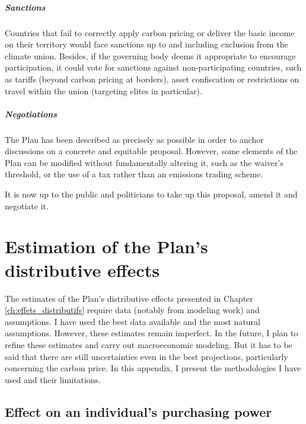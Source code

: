 \documentclass[a5paper,english,openany]{memoir}
\begin{document}
\paragraph{Sanctions}

Countries that fail to correctly apply carbon pricing or deliver the basic income on their territory would face sanctions up to and including exclusion from the climate union. 
Besides, if the governing body deems it appropriate to encourage participation, it could vote for sanctions against non-participating countries, such as tariffs (beyond carbon pricing at borders), asset confiscation or restrictions on travel within the union (targeting elites in particular). 

\paragraph{Negotiations}

The Plan has been described as precisely as possible in order to anchor discussions on a concrete and equitable proposal. However, some elements of the Plan can be modified without fundamentally altering it, such as the waiver's threshold, or the use of a tax rather than an emissions trading scheme. 

It is now up to the public and politicians to take up this proposal, amend it and negotiate it.



\chapter{Estimation of the Plan's distributive effects}\label{ch:methodo}

The estimates of the Plan's distributive effects presented in Chapter \ref{ch:effets_distributifs} require data (notably from modeling work) and assumptions. 
I have used the best data available and the most natural assumptions. However, these estimates remain imperfect. In the future, I plan to refine these estimates and carry out macroeconomic modeling. But it has to be said that there are still uncertainties even in the best projections, particularly concerning the carbon price. 
In this appendix, I present the methodologies I have used and their limitations.

\section{Effect on an individual's purchasing power}\label{app:indiv}
\end{document}
